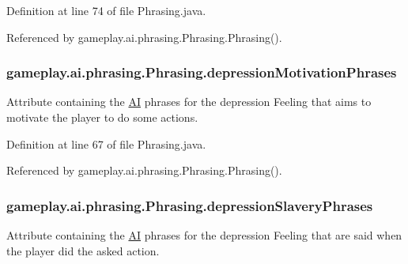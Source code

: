 Definition at line 74 of file Phrasing.\-java.



Referenced by gameplay.\-ai.\-phrasing.\-Phrasing.\-Phrasing().

\hypertarget{a00018_a7134cba12ee037a9737e6e5dcdc02ba8}{
\subsubsection[{depression\-Motivation\-Phrases}]{ gameplay.\-ai.\-phrasing.\-Phrasing.\-depression\-Motivation\-Phrases\hspace{0.3cm}{\ttfamily [protected]}}}\label{a00018_a7134cba12ee037a9737e6e5dcdc02ba8}


Attribute containing the \hyperlink{a00001}{A\-I} phrases for the depression Feeling that aims to motivate the player to do some actions. 



Definition at line 67 of file Phrasing.\-java.



Referenced by gameplay.\-ai.\-phrasing.\-Phrasing.\-Phrasing().

\hypertarget{a00018_ab8f4fdd33f163351fb6ff578cb950a44}{
\subsubsection[{depression\-Slavery\-Phrases}]{ gameplay.\-ai.\-phrasing.\-Phrasing.\-depression\-Slavery\-Phrases\hspace{0.3cm}{\ttfamily [protected]}}}\label{a00018_ab8f4fdd33f163351fb6ff578cb950a44}


Attribute containing the \hyperlink{a00001}{A\-I} phrases for the depression Feeling that are said when the player did the asked action. 



